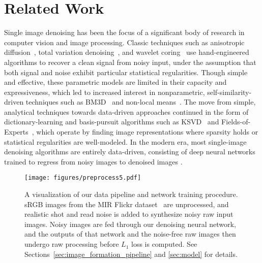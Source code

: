 \documentclass[10pt,twocolumn,letterpaper]{article}
\begin{document}
\section{Related Work}
\label{sec:related}

Single image denoising has been the focus of a significant body of research in computer vision and image processing.
Classic techniques such as anisotropic diffusion~\cite{PeronaMalik1990}, total variation denoising~\cite{Rudin1992}, and wavelet coring~\cite{Simoncelli1996}
use hand-engineered algorithms to recover a clean signal from noisy input, under the assumption that both signal and noise exhibit particular statistical regularities.
Though simple and effective,
these parametric models are limited in their capacity and expressiveness, which led to
increased interest in nonparametric, self-similarity-driven techniques such as BM3D~\cite{BM3D} and non-local means~\cite{NonlocalMeans}.
The move from simple, analytical techniques towards data-driven approaches continued in the form of dictionary-learning and basis-pursuit algorithms such as KSVD~\cite{KSVD} and Fields-of-Experts~\cite{FoE}, which operate by finding image representations where sparsity holds or statistical regularities are well-modeled.
In the modern era, most single-image denoising algorithms are entirely data-driven, consisting of deep neural networks trained to regress from noisy images to denoised images \cite{GharbiDemosaic, CBDnet, NNN, Schmidt2014, TWSC, Zhang2017}.


\begin{figure*}[t!]
\begin{center}
   \texttt{[image: figures/preprocess5.pdf]}
\end{center}
   \caption{A visualization of our data pipeline and network training procedure. sRGB images from the MIR Flickr dataset~\cite{huiskes10mir} are unprocessed, and realistic shot and read noise is added to synthesize noisy raw input images. Noisy images are fed through our denoising neural network, and the outputs of that network and the noise-free raw images then undergo raw processing before $L_{1}$ loss is computed. See Sections~\ref{sec:image_formation_pipeline} and \ref{sec:model} for details.}
\label{fig:datapipeline}
\end{figure*}
\end{document}
